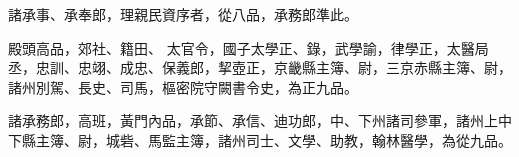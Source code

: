 \begin{pinyinscope}
 諸承事、承奉郎，理親民資序者，從八品，承務郎準此。



 殿頭高品，郊社、籍田、
 太官令，國子太學正、錄，武學諭，律學正，太醫局丞，忠訓、忠翊、成忠、保義郎，挈壺正，京畿縣主簿、尉，三京赤縣主簿、尉，諸州別駕、長史、司馬，樞密院守闕書令史，為正九品。



 諸承務郎，高班，黃門內品，承節、承信、迪功郎，中、下州諸司參軍，諸州上中下縣主簿、尉，城砦、馬監主簿，諸州司士、文學、助教，翰林醫學，為從九品。



\end{pinyinscope}